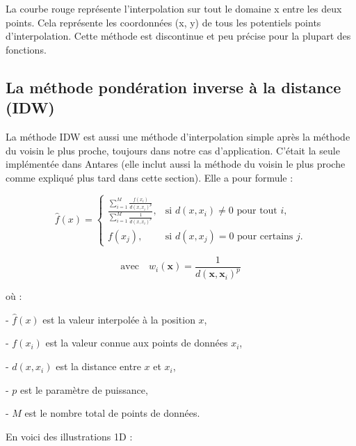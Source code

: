 La courbe rouge représente l'interpolation sur tout le domaine x entre les deux points. Cela représente les coordonnées (x, y) de tous les potentiels points d'interpolation.
Cette méthode est discontinue et peu précise pour la plupart des fonctions.



\subsection{La méthode pondération inverse à la distance (IDW)}\label{sIDW} %

La méthode IDW est aussi une méthode d'interpolation simple après la méthode du voisin le plus proche, toujours dans notre cas d'application. C'était la seule implémentée dans Antares (elle inclut aussi la méthode du voisin le plus proche comme expliqué plus tard dans cette section). Elle a pour formule :

\begin{equation}
    \hat{f}(x) = 
    \begin{cases}
    \frac{\sum_{i=1}^{M} \frac{f(x_i)}{d(x, x_i)^p}}{\sum_{i=1}^{M} \frac{1}{d(x, x_i)^p}}, & \text{si } d(x, x_i) \neq 0 \text{ pour tout } i, \\ 
    f(x_j), & \text{si } d(x, x_j) = 0 \text{ pour certains } j.
    \end{cases}
\end{equation}


\[
\text{avec} \quad w_i(\mathbf{x}) = \frac{1}{d(\mathbf{x}, \mathbf{x}_i)^p}
\]


où :

- \(\hat{f}(x)\) est la valeur interpolée à la position \(x\),

\vspace{-0,2 cm}

- \(f(x_i)\) est la valeur connue aux points de données \(x_i\),

\vspace{-0,2 cm}

- \(d(x, x_i)\) est la distance entre \(x\) et \(x_i\),

\vspace{-0,2 cm}

- \(p\) est le paramètre de puissance,

\vspace{-0,2 cm}

- \(M\) est le nombre total de points de données.


En voici des illustrations 1D :

